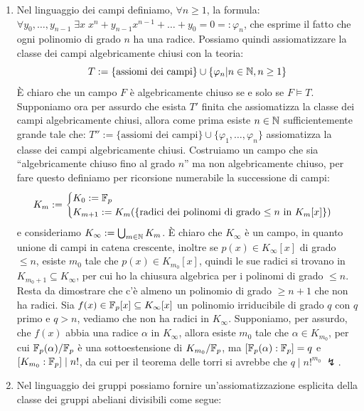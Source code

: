 \begin{soln}
\begin{enumerate}
        Siamo dunque arrivati ad un assurdo perché $\FF_{p_{n+1}} \models T''$ ed ha caratteristica $p_{n+1}$.
        \item Nel linguaggio dei campi definiamo, $\forall n \geq 1$, la formula: $\forall y_0, \ldots, y_{n-1} \; \exists x \; x^n + y_{n-1} x^{n-1} + \ldots + y_0 = 0 =: \varphi_n$, che esprime il fatto che ogni polinomio di grado $n$ ha una radice.
        Possiamo quindi assiomatizzare la classe dei campi algebricamente chiusi con la teoria:
        \[ T := \{\text{assiomi dei campi}\} \cup \{\varphi_n | n \in \mathbb N, n \geq 1\}
        \]
        È chiaro che un campo $F$ è algebricamente chiuso se e solo se $F \models T$. Supponiamo ora per assurdo che esista $T'$ finita che assiomatizza la classe dei campi algebricamente chiusi, allora come prima esiste $n \in \mathbb N$ sufficientemente grande tale che:
        $T'' := \{\text{assiomi dei campi}\} \cup \{\varphi_1, \ldots, \varphi_n\}$ assiomatizza la classe dei campi algebricamente chiusi. Costruiamo un campo che sia ``algebricamente chiuso fino al grado $n$'' ma non algebricamente chiuso, per fare questo definiamo per ricorsione numerabile la successione di campi:
        \[ K_m := \begin{cases}
            K_0 := \mathbb F_p \\
            K_{m+1} := K_m(\{\text{radici dei polinomi di grado $\leq n$ in $K_m[x]$}\})
        \end{cases} \]
        e consideriamo $K_\infty := \bigcup_{m \in \mathbb N} K_m$. È chiaro che $K_\infty$ è un campo, in quanto unione di campi in catena crescente, inoltre se $p(x) \in K_\infty[x]$ di grado $\leq n$,
        esiste $m_0$ tale che $p(x) \in K_{m_0}[x]$, quindi le sue radici si trovano in $K_{m_0+1} \subseteq K_\infty$, per cui ho la chiusura algebrica per i polinomi di grado $\leq n$.
        Resta da dimostrare che c'è almeno un polinomio di grado $\geq n+1$ che non ha radici. Sia $f(x) \in \mathbb F_p[x] \subseteq K_\infty[x]$ un polinomio irriducibile di grado $q$ con $q$ primo e $q > n$, vediamo che non ha radici in $K_\infty$.
        Supponiamo, per assurdo, che $f(x)$ abbia una radice $\alpha$ in $K_\infty$, allora esiste $m_0$ tale che $\alpha \in K_{m_0}$, per cui $\mathbb F_p(\alpha)/\mathbb F_p$ è una sottoestensione di $K_{m_0}/\mathbb F_p$, ma $[\mathbb F_p(\alpha) : \mathbb F_p] = q$ e $[K_{m_0} : \mathbb F_p] \mid n!$, da cui per il teorema delle torri si avrebbe che $q \mid n!^{m_0} \; \lightning$.
        \item Nel linguaggio dei gruppi possiamo fornire un'assiomatizzazione esplicita della classe dei gruppi abeliani divisibili come segue:

\end{enumerate}
\end{soln}
